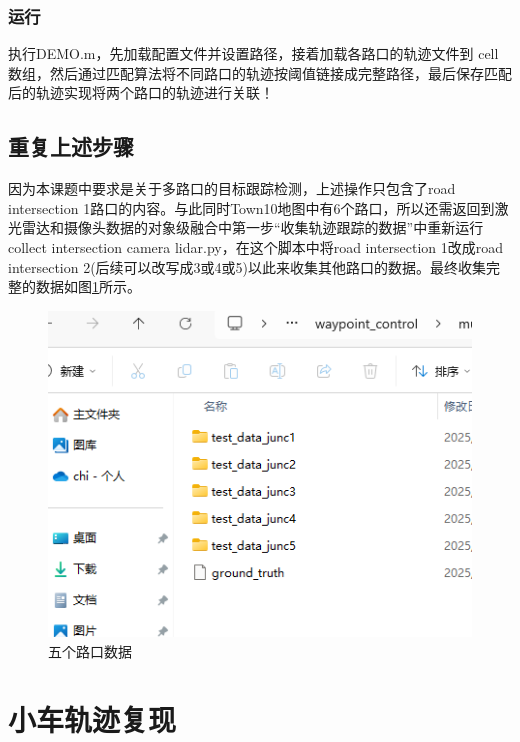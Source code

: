 \subsubsection{运行}
执行DEMO.m，先加载配置文件并设置路径，接着加载各路口的轨迹文件到 cell 数组，然后通过匹配算法将不同路口的轨迹按阈值链接成完整路径，最后保存匹配后的轨迹实现将两个路口的轨迹进行关联！
\subsection{重复上述步骤}
因为本课题中要求是关于多路口的目标跟踪检测，上述操作只包含了road intersection 1路口的内容。与此同时Town10地图中有6个路口，所以还需返回到激光雷达和摄像头数据的对象级融合中第一步“收集轨迹跟踪的数据”中重新运行collect intersection camera lidar.py，在这个脚本中将road intersection 1改成road intersection 2(后续可以改写成3或4或5)以此来收集其他路口的数据。最终收集完整的数据如图\ref{fig:p18}所示。




\begin{figure}[htbp] %
	\centering
	\includegraphics[width=1\textwidth]{p18} %
	\caption{五个路口数据} %
	\label{fig:p18} %
\end{figure}






\section{小车轨迹复现}

